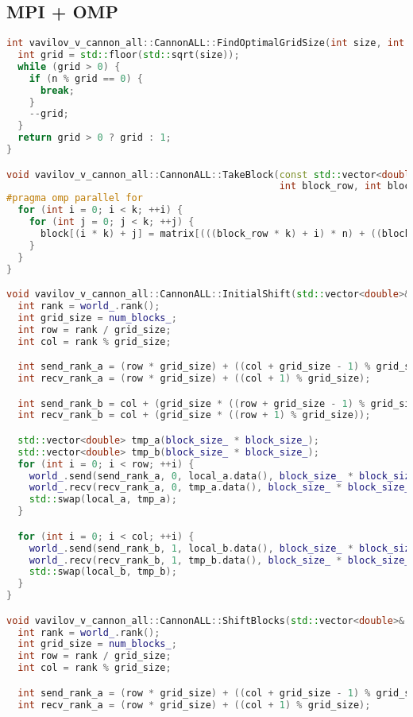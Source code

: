 \documentclass[a4paper,12pt]{article}
\begin{document}
\subsection{MPI + OMP}
\begin{lstlisting}[language=C++]
int vavilov_v_cannon_all::CannonALL::FindOptimalGridSize(int size, int n) {
  int grid = std::floor(std::sqrt(size));
  while (grid > 0) {
    if (n % grid == 0) {
      break;
    }
    --grid;
  }
  return grid > 0 ? grid : 1;
}

void vavilov_v_cannon_all::CannonALL::TakeBlock(const std::vector<double>& matrix, double* block, int n, int k,
                                                int block_row, int block_col) {
#pragma omp parallel for
  for (int i = 0; i < k; ++i) {
    for (int j = 0; j < k; ++j) {
      block[(i * k) + j] = matrix[(((block_row * k) + i) * n) + ((block_col * k) + j)];
    }
  }
}

void vavilov_v_cannon_all::CannonALL::InitialShift(std::vector<double>& local_a, std::vector<double>& local_b) {
  int rank = world_.rank();
  int grid_size = num_blocks_;
  int row = rank / grid_size;
  int col = rank % grid_size;

  int send_rank_a = (row * grid_size) + ((col + grid_size - 1) % grid_size);
  int recv_rank_a = (row * grid_size) + ((col + 1) % grid_size);

  int send_rank_b = col + (grid_size * ((row + grid_size - 1) % grid_size));
  int recv_rank_b = col + (grid_size * ((row + 1) % grid_size));

  std::vector<double> tmp_a(block_size_ * block_size_);
  std::vector<double> tmp_b(block_size_ * block_size_);
  for (int i = 0; i < row; ++i) {
    world_.send(send_rank_a, 0, local_a.data(), block_size_ * block_size_);
    world_.recv(recv_rank_a, 0, tmp_a.data(), block_size_ * block_size_);
    std::swap(local_a, tmp_a);
  }

  for (int i = 0; i < col; ++i) {
    world_.send(send_rank_b, 1, local_b.data(), block_size_ * block_size_);
    world_.recv(recv_rank_b, 1, tmp_b.data(), block_size_ * block_size_);
    std::swap(local_b, tmp_b);
  }
}

void vavilov_v_cannon_all::CannonALL::ShiftBlocks(std::vector<double>& local_a, std::vector<double>& local_b) {
  int rank = world_.rank();
  int grid_size = num_blocks_;
  int row = rank / grid_size;
  int col = rank % grid_size;

  int send_rank_a = (row * grid_size) + ((col + grid_size - 1) % grid_size);
  int recv_rank_a = (row * grid_size) + ((col + 1) % grid_size);


\end{lstlisting}
\end{document}
